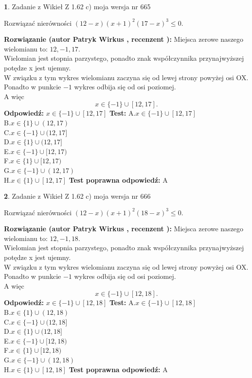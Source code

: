 \documentclass[12pt, a4paper]{article}
\theoremstyle{definition} %
\newtheorem{zad}{}
\newcommand{\zadStart}[1]{\begin{zad}#1\newline}
\newcommand{\zadStop}{\end{zad}}
\newcommand{\rozwStart}[2]{\noindent \textbf{Rozwiązanie (autor #1 , recenzent #2): }\newline}
\newcommand{\rozwStop}{\newline}
\newcommand{\odpStart}{\noindent \textbf{Odpowiedź:}\newline}
\newcommand{\odpStop}{\newline}
\newcommand{\testStart}{\noindent \textbf{Test:}\newline}
\newcommand{\testStop}{\newline}
\newcommand{\kluczStart}{\noindent \textbf{Test poprawna odpowiedź:}\newline}
\newcommand{\kluczStop}{\newline}
\begin{document}
\zadStart{Zadanie z Wikieł Z 1.62 c) moja wersja nr 665}

Rozwiązać nierówności $(12-x)(x+1)^{2}(17-x)^{3}\le0$.
\zadStop
\rozwStart{Patryk Wirkus}{}
Miejsca zerowe naszego wielomianu to: $12, -1, 17$.\\
Wielomian jest stopnia parzystego, ponadto znak współczynnika przy\linebreak najwyższej potędze x jest ujemny.\\ W związku z tym wykres wielomianu zaczyna się od lewej strony powyżej osi OX.\\
Ponadto w punkcie $-1$ wykres odbija się od osi poziomej.\\
A więc $$x \in \{-1\} \cup [12,17].$$
\rozwStop
\odpStart
$x \in \{-1\} \cup [12,17]$
\odpStop
\testStart
A.$x \in \{-1\} \cup [12,17]$\\
B.$x \in \{1\} \cup (12,17)$\\
C.$x \in \{-1\} \cup (12,17]$\\
D.$x \in \{1\} \cup (12,17]$\\
E.$x \in \{-1\} \cup [12,17)$\\
F.$x \in \{1\} \cup [12,17)$\\
G.$x \in \{-1\} \cup (12,17)$\\
H.$x \in \{1\} \cup [12,17]$
\testStop
\kluczStart
A
\kluczStop



\zadStart{Zadanie z Wikieł Z 1.62 c) moja wersja nr 666}

Rozwiązać nierówności $(12-x)(x+1)^{2}(18-x)^{3}\le0$.
\zadStop
\rozwStart{Patryk Wirkus}{}
Miejsca zerowe naszego wielomianu to: $12, -1, 18$.\\
Wielomian jest stopnia parzystego, ponadto znak współczynnika przy\linebreak najwyższej potędze x jest ujemny.\\ W związku z tym wykres wielomianu zaczyna się od lewej strony powyżej osi OX.\\
Ponadto w punkcie $-1$ wykres odbija się od osi poziomej.\\
A więc $$x \in \{-1\} \cup [12,18].$$
\rozwStop
\odpStart
$x \in \{-1\} \cup [12,18]$
\odpStop
\testStart
A.$x \in \{-1\} \cup [12,18]$\\
B.$x \in \{1\} \cup (12,18)$\\
C.$x \in \{-1\} \cup (12,18]$\\
D.$x \in \{1\} \cup (12,18]$\\
E.$x \in \{-1\} \cup [12,18)$\\
F.$x \in \{1\} \cup [12,18)$\\
G.$x \in \{-1\} \cup (12,18)$\\
H.$x \in \{1\} \cup [12,18]$
\testStop
\kluczStart
A
\kluczStop
\end{document}
